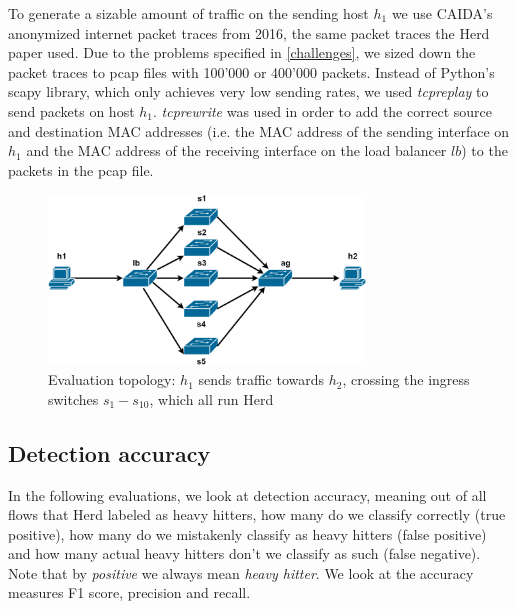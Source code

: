 \documentclass[11pt,oneside,a4paper]{article}
\begin{document}
\noindent To generate a sizable amount of traffic on the sending host $h_1$ we use CAIDA's anonymized internet packet traces from 2016, the same packet traces the Herd paper used. Due to the problems specified in \ref{challenges}, we sized down the packet traces to pcap files with 100'000 or 400'000 packets. Instead of Python's scapy library, which only achieves very low sending rates, we used \textit{tcpreplay} to send packets on host $h_1$. \textit{tcprewrite} was used in order to add the correct source and destination MAC addresses (i.e. the MAC address of the sending interface on $h_1$ and the MAC address of the receiving interface on the load balancer $lb$) to the packets in the pcap file.

 
\begin{figure}
	\centering
	\includegraphics[width=0.75\textwidth]{figures/Herd_topology}
	\caption{Evaluation topology: $h_1$ sends traffic towards $h_2$, crossing the ingress switches $s_1 - s_{10}$, which all run Herd}
	\label{fig:topology_fig}
\end{figure}

\subsection{Detection accuracy} \label{accuracy}

In the following evaluations, we look at detection accuracy, meaning out of all flows that Herd labeled as heavy hitters, how many do we classify correctly (true positive), how many do we mistakenly classify as heavy hitters (false positive) and how many actual heavy hitters don't we classify as such (false negative). Note that by \textit{positive} we always mean \textit{heavy hitter}. We look at the accuracy measures F1 score, precision and recall.



\end{document}

